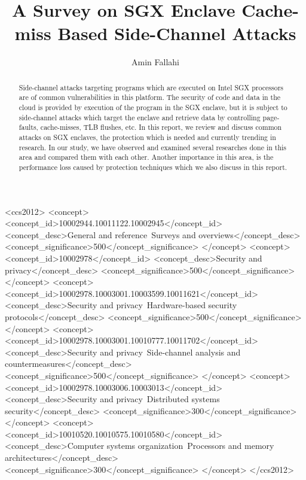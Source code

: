 \documentclass[format=acmsmall, review=false, screen=true]{acmart}
\begin{document}
\title{A Survey on SGX Enclave Cache-miss Based Side-Channel Attacks}

\author{Amin Fallahi}



\begin{abstract}
Side-channel attacks targeting programs which are executed on Intel SGX processors are of common vulnerabilities in this platform. The security of code and data in the cloud is provided by execution of the program in the SGX enclave, but it is subject to side-channel attacks which target the enclave and retrieve data by controlling page-faults, cache-misses, TLB flushes, etc. In this report, we review and discuss common attacks on SGX enclaves, the protection which is needed and currently trending in research. In our study, we have observed and examined several researches done in this area and compared them with each other. Another importance in this area, is the performance loss caused by protection techniques which we also discuss in this report.
\end{abstract}


%
%
 \begin{CCSXML}
	<ccs2012>
	<concept>
	<concept_id>10002944.10011122.10002945</concept_id>
	<concept_desc>General and reference~Surveys and overviews</concept_desc>
	<concept_significance>500</concept_significance>
	</concept>
	<concept>
	<concept_id>10002978</concept_id>
	<concept_desc>Security and privacy</concept_desc>
	<concept_significance>500</concept_significance>
	</concept>
	<concept>
	<concept_id>10002978.10003001.10003599.10011621</concept_id>
	<concept_desc>Security and privacy~Hardware-based security protocols</concept_desc>
	<concept_significance>500</concept_significance>
	</concept>
	<concept>
	<concept_id>10002978.10003001.10010777.10011702</concept_id>
	<concept_desc>Security and privacy~Side-channel analysis and countermeasures</concept_desc>
	<concept_significance>500</concept_significance>
	</concept>
	<concept>
	<concept_id>10002978.10003006.10003013</concept_id>
	<concept_desc>Security and privacy~Distributed systems security</concept_desc>
	<concept_significance>300</concept_significance>
	</concept>
	<concept>
	<concept_id>10010520.10010575.10010580</concept_id>
	<concept_desc>Computer systems organization~Processors and memory architectures</concept_desc>
	<concept_significance>300</concept_significance>
	</concept>
	</ccs2012>
\end{CCSXML}
\end{document}
